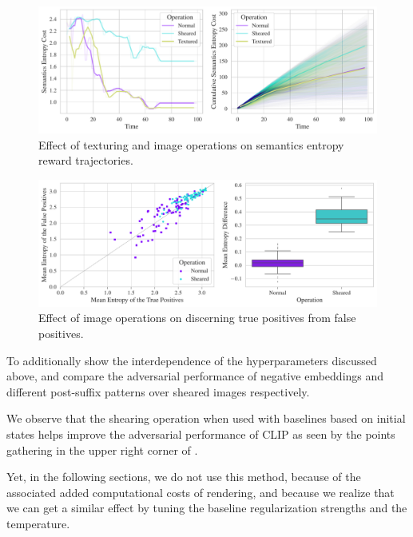 \begin{figure}[H]
    \centering
    \includegraphics[width=\textwidth]{images/texturing_operations_comparison.pdf}
    \caption{Effect of texturing and image operations on semantics entropy reward trajectories.}
    \label{fig:texturing-operations}
\end{figure}

\begin{figure}[H]
    \centering
    \includegraphics[width=\textwidth]{images/texturing-operations_adversarial_2.pdf}
    \caption{Effect of image operations on discerning true positives from false positives.}
    \label{fig:texturing-operations-adversarial}
\end{figure}

To additionally show the interdependence of the hyperparameters discussed above,  and  compare the adversarial performance of negative embeddings and different post-suffix patterns over sheared images respectively.

We observe that the shearing operation when used with baselines based on initial states helps improve the adversarial performance of CLIP as seen by the points gathering in the upper right corner of .

Yet, in the following sections, we do not use this method, because of the associated added computational costs of rendering, and because we realize that we can get a similar effect by tuning the baseline regularization strengths and the temperature.

